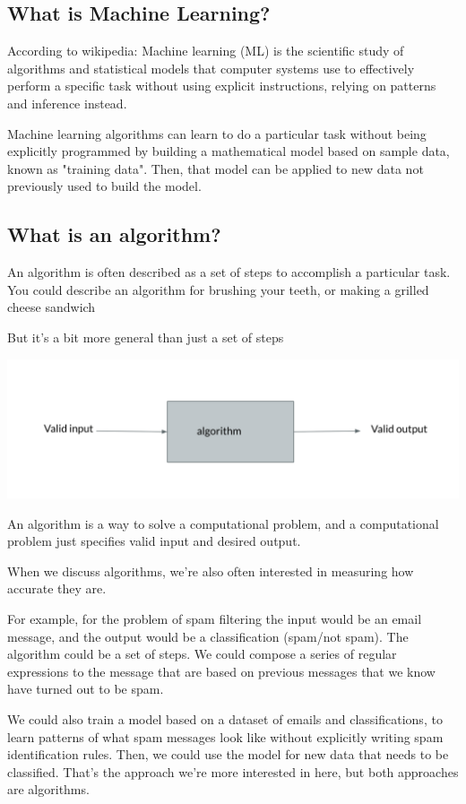 \documentclass[12pt]{article}
\begin{document}
\subsection{What is Machine Learning?}

According to wikipedia:
Machine learning (ML) is the scientific study of algorithms and statistical models that computer systems use to effectively perform a specific task without using explicit instructions, relying on patterns and inference instead.


Machine learning algorithms can learn to do a particular task without being explicitly programmed by building a mathematical model based on sample data, known as "training data". Then, that model can be applied to new data not previously used to build the model.

\subsection{What is an algorithm?}

An algorithm is often described as a set of steps to accomplish a particular task. You could describe an algorithm for brushing your teeth, or making a grilled cheese sandwich 

But it's a bit more general than just a set of steps 

\includegraphics[width={\textwidth}]{algo-abstract}


An algorithm is a way to solve a computational problem, and a computational problem just specifies valid input and desired output. 

When we discuss algorithms, we're also often interested in measuring how accurate they are.

For example, for the problem of spam filtering the input would be an email message, and the output would be a classification (spam/not spam). The algorithm could be a set of steps. We could compose a series of regular expressions to the message that are based on previous messages that we know have turned out to be spam. 

We could also train a model based on a dataset of emails and classifications, to learn patterns of what spam messages look like without explicitly writing spam identification rules. Then, we could use the model for new data that needs to be classified. That's the approach we're more interested in here, but both approaches are algorithms.
\end{document}
